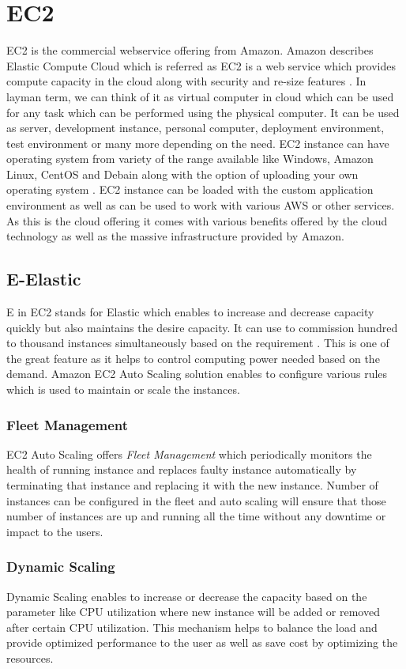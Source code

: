 \section{EC2}
EC2 is the commercial webservice offering from Amazon. Amazon describes Elastic Compute Cloud which is referred as EC2 is a web service which provides compute capacity in the cloud along with security and re-size features \cite{www-aws-ec2}. In layman term, we can think of it as virtual computer in cloud which can be used for any task which can be performed using the physical computer. It can be used as server, development instance, personal computer, deployment environment, test environment or many more depending on the need. EC2 instance can have operating system from variety of the range available like Windows, Amazon Linux, CentOS and Debain along with the option of uploading your own operating system \cite{www-aws-ec2-details}. EC2 instance can be loaded with the custom application environment as well as can be used to work with various AWS or other services. As this is the cloud offering it comes with various benefits offered by the cloud technology as well as the massive infrastructure provided by Amazon.

\subsection{E-Elastic}
E in EC2 stands for Elastic which enables to increase and decrease capacity quickly but also maintains the desire capacity. It can use to commission hundred to thousand instances simultaneously based on the requirement \cite{www-aws-ec2}. This is one of the great feature as it helps to control computing power needed based on the demand. 
Amazon EC2 Auto Scaling \cite{www-aws-ec2autoscaling} solution enables to configure various rules which is used to maintain or scale the instances. 
\subsubsection{Fleet Management}
EC2 Auto Scaling offers \emph{Fleet Management} which periodically monitors the health of running instance and replaces faulty instance automatically by terminating that instance and replacing it with the new instance. Number of instances can be configured in the fleet and auto scaling will ensure that those number of instances are up and running all the time without any downtime or impact to the users.
\subsubsection{Dynamic Scaling}
Dynamic Scaling enables to increase or decrease the capacity based on the parameter like CPU utilization where new instance will be added or removed after certain CPU utilization. This mechanism helps to balance the load and provide optimized performance to the user as well as save cost by optimizing the resources.

